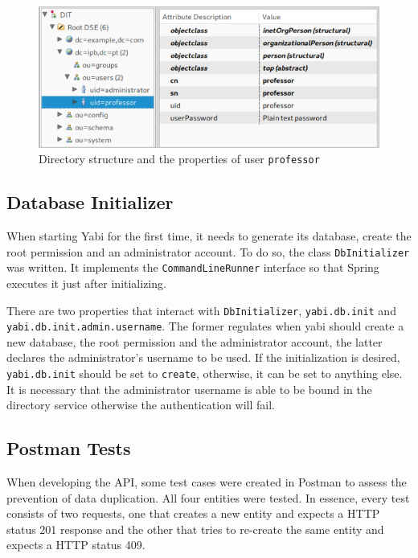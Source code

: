 \begin{figure}
  \centering
  \includegraphics[width=.8\textwidth]{images/screenshots/ldap-directory}
  \caption{Directory structure and the properties of user \texttt{professor}}\label{fig:adsconfig}
\end{figure}

\subsection{Database Initializer}\label{dbinit}
When starting \gls{Yabi} for the first time, it needs to generate its database, create the root permission and an administrator account.
To do so, the class \texttt{DbInitializer} was written. It implements the \texttt{CommandLineRunner} interface so that Spring executes it just after initializing.

There are two properties that interact with \texttt{DbInitializer}, \texttt{yabi.db.init} and \texttt{yabi.db.init.admin.username}. The former regulates when yabi should create a new database, the root permission and the administrator account, the latter declares the administrator's username to be used. If the initialization is desired, \texttt{yabi.db.init} should be set to \texttt{create}, otherwise, it can be set to anything else. It is necessary that the administrator username is able to be bound in the directory service otherwise the authentication will fail.

\subsection{Postman Tests}\label{ptt}
When developing the \gls{API}, some test cases were created in Postman to assess the prevention of data duplication. All four entities were tested.
In essence, every test consists of two requests, one that creates a new entity and expects a \gls{HTTP} status 201 response and the other that tries to re-create the same entity and expects a \gls{HTTP} status 409.

